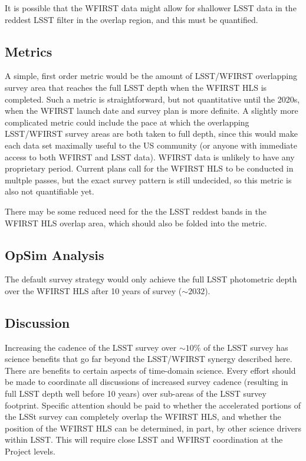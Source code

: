 It is possible that the WFIRST data might allow for shallower LSST data
in the reddest LSST filter in the overlap region, and this must be
quantified.



\subsection{Metrics}
\label{sec:\secname:metrics}

A simple, first order metric would be the amount of LSST/WFIRST
overlapping survey area that reaches the full LSST depth when the WFIRST
HLS is completed.  Such a metric is straightforward, but not
quantitative until the 2020s, when the WFIRST launch date and survey
plan is more definite.  A slightly more complicated metric could include
the pace at which the overlapping LSST/WFIRST survey areas are both
taken to full depth, since this would make each data set maximally
useful to the US community (or anyone with immediate access to both
WFIRST and LSST data).  WFIRST data is unlikely to have any proprietary
period.  Current plans call for the WFIRST HLS to be conducted in
multple passes, but the exact survey pattern is still undecided, so this
metric is also not quantifiable yet.

There may be some reduced need for the the LSST reddest bands in the
WFIRST HLS overlap area, which should also be folded into the metric.


\subsection{OpSim Analysis}
\label{sec:\secname:analysis}

The default survey strategy would only achieve the full LSST photometric
depth over the WFIRST HLS after 10 years of survey ($\sim2032$).



\subsection{Discussion}
\label{sec:\secname:discussion}

Increasing the cadence of the LSST survey over $\sim10\%$ of the LSST
survey has science benefits that go far beyond the LSST/WFIRST synergy
described here.  There are benefits to certain aspects of time-domain
science.  Every effort should be made to coordinate all discussions of
increased survey cadence (resulting in full LSST depth well before 10
years) over sub-areas of the LSST survey footprint.  Specific attention
should be paid to whether the accelerated portions of the LSSt survey
can completely overlap the WFIRST HLS, and whether the position of the
WFIRST HLS can be determined, in part, by other science drivers within
LSST.  This will require close LSST and WFIRST coordination at the
Project levels.



\navigationbar

